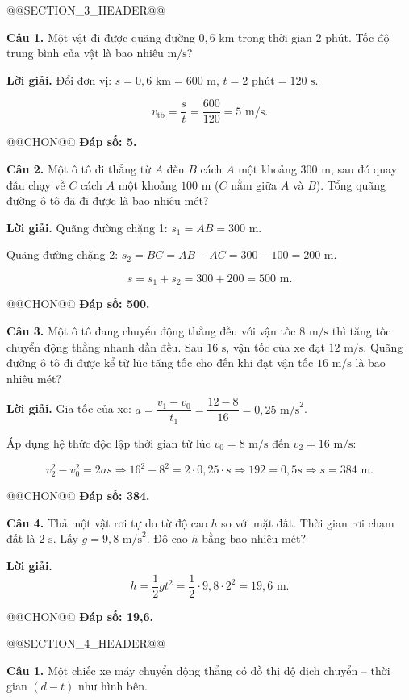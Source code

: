 \documentclass{article}
\begin{document}
@@SECTION_3_HEADER@@

\textbf{Câu 1.} Một vật đi được quãng đường $0{,}6\text{ km}$ trong thời gian $2\text{ phút}$. Tốc độ trung bình của vật là bao nhiêu $\text{m/s}$?

\textbf{Lời giải.} Đổi đơn vị: $s = 0{,}6\text{ km} = 600\text{ m}$, $t = 2\text{ phút} = 120\text{ s}$.

\[v_{\text{tb}} = \frac{s}{t} = \frac{600}{120} = 5\text{ m/s}.\]

@@CHON@@ \textbf{Đáp số: 5.}

\textbf{Câu 2.} Một ô tô đi thẳng từ $A$ đến $B$ cách $A$ một khoảng $300\text{ m}$, sau đó quay đầu chạy về $C$ cách $A$ một khoảng $100\text{ m}$ ($C$ nằm giữa $A$ và $B$). Tổng quãng đường ô tô đã đi được là bao nhiêu mét?

\textbf{Lời giải.} Quãng đường chặng 1: $s_1 = AB = 300\text{ m}$.

Quãng đường chặng 2: $s_2 = BC = AB - AC = 300 - 100 = 200\text{ m}$.

\[s = s_1 + s_2 = 300 + 200 = 500\text{ m}.\]

@@CHON@@ \textbf{Đáp số: 500.}

\textbf{Câu 3.} Một ô tô đang chuyển động thẳng đều với vận tốc $8\text{ m/s}$ thì tăng tốc chuyển động thẳng nhanh dần đều. Sau $16\text{ s}$, vận tốc của xe đạt $12\text{ m/s}$. Quãng đường ô tô đi được kể từ lúc tăng tốc cho đến khi đạt vận tốc $16\text{ m/s}$ là bao nhiêu mét?

\textbf{Lời giải.} Gia tốc của xe: $a = \dfrac{v_1 - v_0}{t_1} = \dfrac{12 - 8}{16} = 0{,}25\text{ m/s}^2$.

Áp dụng hệ thức độc lập thời gian từ lúc $v_0 = 8\text{ m/s}$ đến $v_2 = 16\text{ m/s}$:

\[v_2^2 - v_0^2 = 2as \Rightarrow 16^2 - 8^2 = 2 \cdot 0{,}25 \cdot s \Rightarrow 192 = 0{,}5s \Rightarrow s = 384\text{ m}.\]

@@CHON@@ \textbf{Đáp số: 384.}

\textbf{Câu 4.} Thả một vật rơi tự do từ độ cao $h$ so với mặt đất. Thời gian rơi chạm đất là $2\text{ s}$. Lấy $g = 9{,}8\text{ m/s}^2$. Độ cao $h$ bằng bao nhiêu mét?

\textbf{Lời giải.} \[h = \frac{1}{2}gt^2 = \frac{1}{2} \cdot 9{,}8 \cdot 2^2 = 19{,}6\text{ m}.\]

@@CHON@@ \textbf{Đáp số: 19,6.}

@@SECTION_4_HEADER@@

\textbf{Câu 1.} Một chiếc xe máy chuyển động thẳng có đồ thị độ dịch chuyển -- thời gian $(d - t)$ như hình bên.
\end{document}
